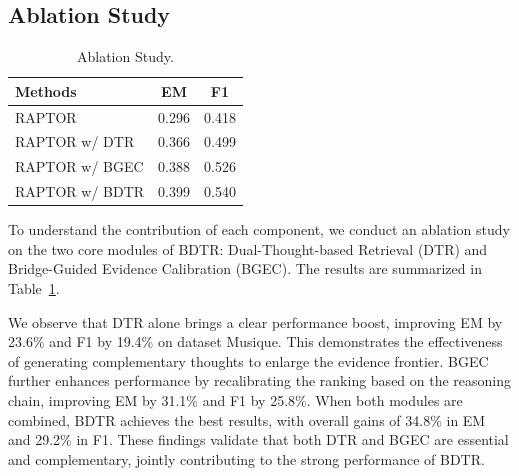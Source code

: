 \documentclass{article} %
\begin{document}
\subsection{Ablation Study}
\label{sec:ablation}
\begin{table}
\centering
\begin{tabular}{lcc}
\toprule
Methods & EM & F1 \\
\midrule
RAPTOR & 0.296 & 0.418 \\
RAPTOR w/ DTR    & 0.366 & 0.499 \\
RAPTOR w/ BGEC     & 0.388 & 0.526 \\
RAPTOR w/ BDTR & 0.399 & 0.540 \\
\end{tabular}
\caption{Ablation Study.}
\label{tab:ablation}
\end{table}
To understand the contribution of each component, we conduct an ablation study on the two core modules of BDTR: Dual-Thought-based Retrieval (DTR) and Bridge-Guided Evidence Calibration (BGEC). The results are summarized in Table~\ref{tab:ablation}.  

We observe that DTR alone brings a clear performance boost, improving EM by 23.6\% and F1 by 19.4\% on dataset Musique. This demonstrates the effectiveness of generating complementary thoughts to enlarge the evidence frontier. BGEC further enhances performance by recalibrating the ranking based on the reasoning chain, improving EM by 31.1\% and F1 by 25.8\%. When both modules are combined, BDTR achieves the best results, with overall gains of 34.8\% in EM and 29.2\% in F1. These findings validate that both DTR and BGEC are essential and complementary, jointly contributing to the strong performance of BDTR.
\end{document}
